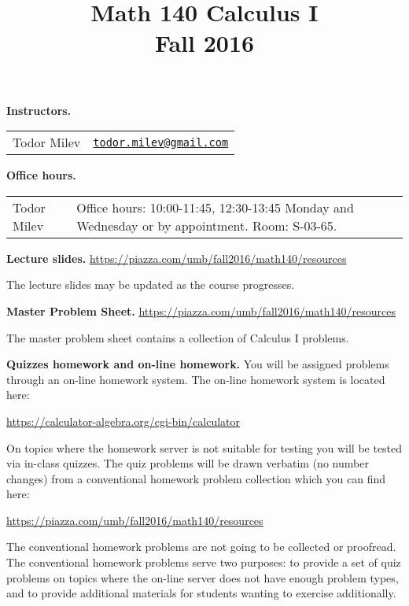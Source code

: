 \documentclass{article}
\title{\vskip -2cm 
 Math 140 Calculus I \\ Fall 2016}
\date{}
\newcommand{\websitebase}{https://piazza.com/umb/fall2016/math140}
\begin{document}
\maketitle


\noindent \textbf{Instructors.} 
\begin{tabular}{ll}
Todor Milev & \href{mailto:todor.milev@gmail.com}{\nolinkurl{todor.milev@gmail.com}} 
\end{tabular}

\medskip
\noindent \textbf{Office hours. } \begin{tabular}{lp{12cm}}
Todor Milev & Office hours: 10:00-11:45, 12:30-13:45 Monday and Wednesday or by appointment. Room: S-03-65.\\
\end{tabular}

\medskip \noindent \textbf{Lecture slides. }  \url{\websitebase/resources}

\medskip\noindent The lecture slides may be updated as the course progresses.


\medskip \noindent \textbf{Master Problem Sheet. }  \url{\websitebase/resources} 

\medskip\noindent The master problem sheet contains a collection of Calculus I problems. 

\medskip
\noindent \textbf{Quizzes homework and on-line homework.} You will be assigned problems through an on-line homework system. The on-line homework system is located here:

\url{https://calculator-algebra.org/cgi-bin/calculator}

\noindent On topics where the homework server is not suitable for testing you will be tested via in-class quizzes. The quiz problems will be drawn verbatim (no number changes) from a conventional homework problem collection which you can find here:

\url{\websitebase/resources}

\noindent  The conventional homework problems are not going to be collected or proofread. The conventional homework problems serve two purposes: to provide a set of quiz problems on topics where the on-line server does not have enough problem types, and to provide additional materials for students wanting to exercise additionally.


\medskip
\end{document}
